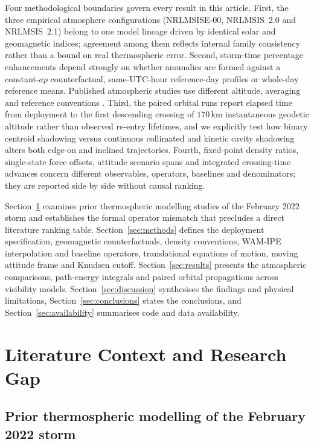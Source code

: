 \documentclass[12pt]{article}
\newcommand{\unit}[1]{\,\mathrm{#1}}
\begin{document}
Four methodological boundaries govern every result in this article. First, the three empirical atmosphere configurations (NRLMSISE-00, NRLMSIS~2.0 and NRLMSIS~2.1) belong to one model lineage driven by identical solar and geomagnetic indices; agreement among them reflects internal family consistency rather than a bound on real thermospheric error. Second, storm-time percentage enhancements depend strongly on whether anomalies are formed against a constant-$ap$ counterfactual, same-UTC-hour reference-day profiles or whole-day reference means. Published atmospheric studies use different altitude, averaging and reference conventions \citep{fang2022,he2023}. Third, the paired orbital runs report elapsed time from deployment to the first descending crossing of $170\unit{km}$ instantaneous geodetic altitude rather than observed re-entry lifetimes, and we explicitly test how binary centroid shadowing versus continuous collimated and kinetic cavity shadowing alters both edge-on and inclined trajectories. Fourth, fixed-point density ratios, single-state force offsets, attitude scenario spans and integrated crossing-time advances concern different observables, operators, baselines and denominators; they are reported side by side without causal ranking.

Section~\ref{sec:literature} examines prior thermospheric modelling studies of the February 2022 storm and establishes the formal operator mismatch that precludes a direct literature ranking table. Section~\ref{sec:methods} defines the deployment specification, geomagnetic counterfactuals, density conventions, WAM-IPE interpolation and baseline operators, translational equations of motion, moving attitude frame and Knudsen cutoff. Section~\ref{sec:results} presents the atmospheric comparisons, path-energy integrals and paired orbital propagations across visibility models. Section~\ref{sec:discussion} synthesises the findings and physical limitations, Section~\ref{sec:conclusions} states the conclusions, and Section~\ref{sec:availability} summarises code and data availability.

\section{Literature Context and Research Gap}
\label{sec:literature}

\subsection{Prior thermospheric modelling of the February 2022 storm}
\label{sec:prior-storm}
\end{document}
